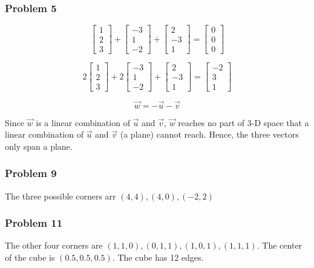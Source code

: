 \documentclass[12pt]{article}
\begin{document}
\subsubsection*{Problem 5}
\[ \begin{bmatrix} 1 \\ 2 \\ 3 \end{bmatrix} 
+ \begin{bmatrix} -3 \\ 1 \\ -2 \end{bmatrix} 
+ \begin{bmatrix} 2 \\ -3 \\ 1 \end{bmatrix} 
= \begin{bmatrix} 0 \\ 0 \\ 0 \end{bmatrix} \]

\[2\begin{bmatrix} 1 \\ 2 \\ 3 \end{bmatrix} 
+ 2\begin{bmatrix} -3 \\ 1 \\ -2 \end{bmatrix} 
+ \begin{bmatrix} 2 \\ -3 \\ 1 \end{bmatrix} 
= \begin{bmatrix} -2 \\ 3 \\ 1 \end{bmatrix} \]

\[\vec{w} = -\vec{u} -\vec{v} \]

\noindent Since $\vec{w}$ is a linear combination of $\vec{u}$ and $\vec{v}$, 
$\vec{w}$ reaches no part of 3-D space that a linear combination of  $\vec{u}$ and 
$\vec{v}$ (a plane) cannot reach. Hence, the three vectors only span a plane. 

\subsubsection*{Problem 9}
The three possible corners arr $(4, 4), (4, 0), (-2, 2)$

\subsubsection*{Problem 11}
The other four corners are $(1, 1, 0), (0, 1, 1), (1, 0, 1), (1, 1, 1)$. The 
center of the cube is $(0.5, 0.5, 0.5)$. The cube has 12 edges. 
\end{document}
